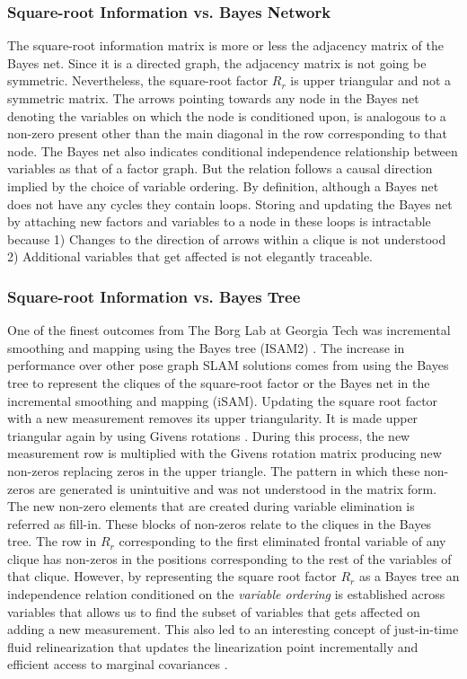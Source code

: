 \subsubsection{Square-root Information vs. Bayes Network}
The square-root information matrix is more or less the adjacency matrix of the Bayes net. Since it is a directed graph, the adjacency matrix is not going be symmetric. Nevertheless, the square-root factor $R_r$ is upper triangular and not a symmetric matrix. The arrows pointing towards any node in the Bayes net denoting the variables on which the node is conditioned upon, is analogous to a non-zero present other than the main diagonal in the row corresponding to that node. The Bayes net also indicates conditional independence relationship between variables as that of a factor graph. But the relation follows a causal direction implied by the choice of variable ordering. By definition, although a Bayes net does not have any cycles they contain loops. Storing and updating the Bayes net by attaching new factors and variables to a node in these loops is intractable because 1) Changes to the direction of arrows within a clique is not understood \cite{kaessbayestree} 2) Additional variables that get affected is not elegantly traceable. 

\subsubsection{Square-root Information vs. Bayes Tree}
\label{sss:r_vs_bt}
One of the finest outcomes from The Borg Lab at Georgia Tech was incremental smoothing and mapping using the Bayes tree (ISAM2) \cite{kaessisam2}. The increase in performance over other pose graph SLAM solutions comes from using the Bayes tree \cite{kaessbayestree} to represent the cliques of the square-root factor or the Bayes net in the incremental smoothing and mapping (iSAM). Updating the square root factor with a new measurement removes its upper triangularity. It is made upper triangular again by using Givens rotations \cite{golubmatrixbook}. During this process, the new measurement row is multiplied with the Givens rotation matrix producing new non-zeros replacing zeros in the upper triangle. The pattern in which these non-zeros are generated is unintuitive and was not understood in the matrix form. The new non-zero elements that are created during variable elimination is referred as fill-in. These blocks of non-zeros relate to the cliques in the Bayes tree. The row in $R_r$ corresponding to the first eliminated frontal variable of any clique has non-zeros in the positions corresponding to the rest of the variables of that clique. However, by representing the square root factor $R_r$ as a Bayes tree an independence relation conditioned on the \textit{variable ordering} is established across variables that allows us to find the subset of variables that gets affected on adding a new measurement. This also led to an interesting concept of just-in-time fluid relinearization that updates the linearization point incrementally and efficient access to marginal covariances \cite{kaesscovariance}. 

